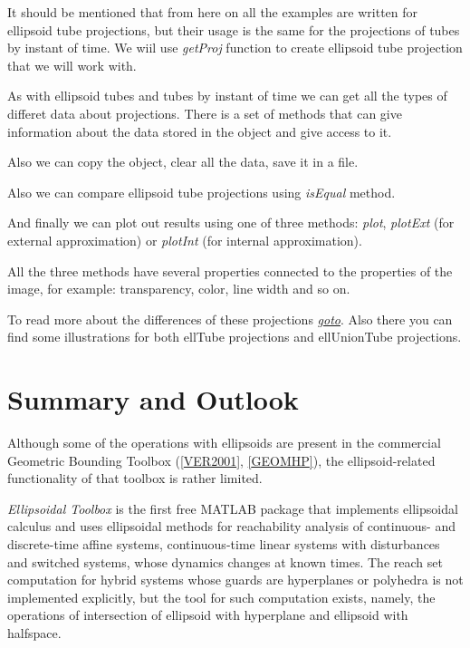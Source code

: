 \documentclass[letterpaper,10pt,english]{sphinxmanual}
\begin{document}
It should be mentioned that from here on all the examples are written for ellipsoid tube projections, but their usage is the same for the projections of tubes by instant of time. We wiil use \emph{getProj} function to create ellipsoid tube projection that we will work with.

As with ellipsoid tubes and tubes by instant of time we can get all the types of differet data about projections. There is a set of methods that can give information about the data stored in the object and give access to it.

Also we can copy the object, clear all the data, save it in a file.

Also we can compare ellipsoid tube projections using \emph{isEqual} method.

And finally we can plot out results using one of three methods: \emph{plot}, \emph{plotExt} (for external approximation) or \emph{plotInt} (for internal approximation).

All the three methods have several properties connected to the properties of the image, for example: transparency, color, line width and so on.

To read more about the differences of these projections {\hyperref[chap_implement:goto-label]{\emph{goto}}}. Also there you can find some illustrations for both ellTube projections and ellUnionTube projections.


\chapter{Summary and Outlook}
\label{chap_summary::doc}\label{chap_summary:summary-and-outlook}
Although some of the operations with ellipsoids are present in the
commercial Geometric Bounding Toolbox ({\hyperref[chap_summary:ver2001]{{[}VER2001{]}}}, {\hyperref[chap_summary:geomhp]{{[}GEOMHP{]}}}),
the ellipsoid-related functionality of that
toolbox is rather limited.

\emph{Ellipsoidal Toolbox} is the first free MATLAB package that implements
ellipsoidal calculus and uses ellipsoidal methods for reachability
analysis of continuous- and discrete-time affine systems,
continuous-time linear systems with disturbances and switched systems,
whose dynamics changes at known times. The reach set computation for
hybrid systems whose guards are hyperplanes or polyhedra is not
implemented explicitly, but the tool for such computation exists,
namely, the operations of intersection of ellipsoid with hyperplane and
ellipsoid with halfspace.
\end{document}
